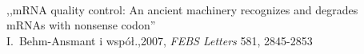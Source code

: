 \documentclass[compress,clock,xcolor=dvipsnames,hyperref={pdfpagelabels=false},final]{beamer}
\begin{document}
\begin{frame}
\begin{columns}
 \begin{column}{0.49\textwidth}
 \end{column}
 \begin{column}{0.49\textwidth}
\\
  \tiny{,,mRNA quality control: An ancient machinery recognizes and degrades mRNAs with nonsense codon''\\
I.~Behm-Ansmant i współ.,2007, {\it  FEBS Letters} 581, 2845-2853}
 \end{column}
\end{columns}
\end{frame}
\end{document}
